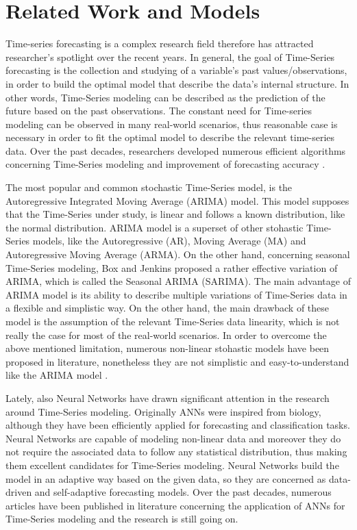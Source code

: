\section{Related Work and Models}
\par Time-series forecasting is a complex research field therefore has attracted researcher's spotlight over the recent years. In general, the goal of Time-Series forecasting is the collection and studying of a variable's past values/observations, in order to build the optimal model that describe the data's internal structure. In other words, Time-Series modeling can be described as the prediction of the future based on the past observations. The constant need for Time-series modeling can be observed in many real-world scenarios, thus reasonable case is necessary in order to fit the optimal model to describe the relevant time-series data. Over the past decades, researchers developed numerous efficient algorithms concerning Time-Series modeling and improvement of forecasting accuracy \cite{zor2017state}. 
\par The most popular and common stochastic Time-Series model, is the Autoregressive Integrated Moving Average (ARIMA) model. This model supposes that the Time-Series under study, is linear and follows a known distribution, like the normal distribution. ARIMA model is a superset of other stohastic Time-Series models, like the Autoregressive (AR), Moving Average (MA) and Autoregressive Moving Average (ARMA). On the other hand, concerning seasonal Time-Series modeling, Box and Jenkins proposed a rather effective variation of ARIMA, which is called the Seasonal ARIMA (SARIMA). The main advantage of ARIMA model is its ability to describe multiple variations of Time-Series data in a flexible and simplistic way. On the other hand, the main drawback of these model is the assumption of the relevant Time-Series data linearity, which is not really the case for most of the real-world scenarios. In order to overcome the above mentioned limitation, numerous non-linear stohastic models have been proposed in literature, nonetheless they are not simplistic and easy-to-understand like the ARIMA model \cite{chan2019comparison}.
\par Lately, also Neural Networks have drawn significant attention in the research around Time-Series modeling. Originally ANNs were inspired from biology, although they have been efficiently applied for forecasting and classification tasks. Neural Networks are capable of modeling non-linear data and moreover they do not require the associated data to follow any statistical distribution, thus making them excellent candidates for Time-Series modeling. Neural Networks build the model in an adaptive way based on the given data, so they are concerned as data-driven and self-adaptive forecasting models. Over the past decades, numerous articles have been published in literature concerning the application of ANNs for Time-Series modeling and the research is still going on.

